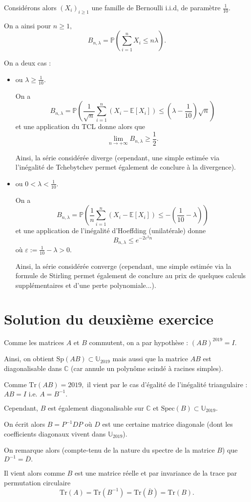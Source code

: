 Considérons alors $(X_{i})_{i\geq 1}$ une famille de Bernoulli i.i.d, de paramètre $\frac{1}{10}.$

On a ainsi pour $n\geq 1,$ $$ B_{n,\lambda}=\mathbb{P}(\sum_{i=1}^{n}X_{i} \leq n\lambda).$$

On a deux cas : 
\begin{itemize}
    \item ou $\displaystyle \lambda\geq \frac{1}{10}.$
    
On a $$ B_{n,\lambda}=\mathbb{P}\left( \frac{1}{\sqrt{n}}\sum_{i=1}^{n}\left( X_{i}-\mathbb{E}[X_{i}]\right)\leq (\lambda-\frac{1}{10})\sqrt{n}\right)$$ et une application du TCL donne alors que $$ \lim_{n\rightarrow +\infty} B_{n,\lambda}\geq \frac{1}{2}.$$

Ainsi, la série considérée diverge (cependant, une simple estimée via l'inégalité de Tchebytchev permet également de conclure à la divergence).

\item ou $\displaystyle 0<\lambda<\frac{1}{10}.$

On a $$ B_{n,\lambda}=\mathbb{P}\left( \frac{1}{n}\sum_{i=1}^{n}\left( X_{i}-\mathbb{E}[X_{i}]\right)\leq -(\frac{1}{10}-\lambda)\right)$$ et une application de l'inégalité d'Hoeffding (unilatérale) donne $$B_{n,\lambda}\leq e^{-2\varepsilon^{2}n}$$ où $\displaystyle \varepsilon:=\frac{1}{10}-\lambda>0.$

Ainsi, la série considérée converge (cependant, une simple estimée via la formule de Stirling permet également de conclure au prix de quelques calculs supplémentaires et d'une perte polynomiale...).    
    
\end{itemize}

\section{Solution du deuxième exercice}

Comme les matrices $A$ et $B$ commutent, on a par hypothèse : $\displaystyle (AB)^{2019}=I.$

Ainsi, on obtient $\mbox{Sp}(AB)\subset \mathbb{U}_{2019}$ mais aussi que la matrice $AB$ est diagonalisable dans $\mathbb{C}$ (car annule un polynôme scindé à racines simples).

Comme $\mbox{Tr}(AB)=2019,$ il vient par le cas d'égalité de l'inégalité triangulaire : $AB=I \mbox{ i.e. } A=B^{-1}.$

Cependant, $B$ est également diagonalisable sur $\mathbb{C}$ et $\mbox{Spec}(B)\subset \mathbb{U}_{2019}.$ 

On écrit alors $B=P^{-1}DP$ où $D$ est une certaine matrice diagonale (dont les coefficients diagonaux vivent dans $\mathbb{U}_{2019}$).

On remarque alors (compte-tenu de la nature du spectre de la matrice $B$) que $\displaystyle D^{-1}=\overline{D}.$

Il vient alors comme $B$ est une matrice réelle et par invariance de la trace par permutation circulaire $$\mbox{Tr}(A)=\mbox{Tr}(B^{-1})=\mbox{Tr}(\overline{B})=\mbox{Tr}(B).$$


